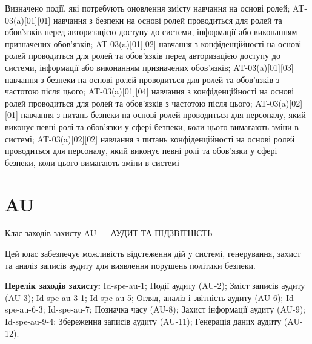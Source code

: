 \documentclass{article}
\begin{document}
{\footnotesize Визначено події, які потребують оновлення змісту навчання на основі ролей; AT-03(a)[01][01] навчання з безпеки на основі ролей проводиться для ролей та обов'язків перед авторизацією доступу до системи, інформації або виконанням призначених обов'язків; AT-03(a)[01][02] навчання з конфіденційності на основі ролей проводиться для ролей та обов'язків перед авторизацією доступу до системи, інформації або виконанням призначених обов'язків; AT-03(a)[01][03] навчання з безпеки на основі ролей проводиться для ролей та обов'язків з частотою після цього; AT-03(a)[01][04] навчання з конфіденційності на основі ролей проводиться для ролей та обов'язків з частотою після цього; AT-03(a)[02][01] навчання з питань безпеки на основі ролей проводиться для персоналу, який виконує певні ролі та обов'язки у сфері безпеки, коли цього вимагають зміни в системі; AT-03(a)[02][02] навчання з питань конфіденційності на основі ролей проводиться для персоналу, який виконує певні ролі та обов'язки у сфері безпеки, коли цього вимагають зміни в системі}




\section{AU}
Клас заходів захисту AU --- АУДИТ ТА ПІДЗВІТНІСТЬ

Цей клас забезпечує можливість відстеження дій у системі, генерування, захист та аналіз записів аудиту для виявлення порушень політики безпеки.

\textbf{Перелік заходів захисту:} Id-spe-au-1; Події аудиту (AU-2); Зміст записів аудиту (AU-3); Id-spe-au-3-1; Id-spe-au-5; Огляд, аналіз і звітність аудиту (AU-6); Id-spe-au-6-3; Id-spe-au-7; Позначка часу (AU-8); Захист інформації аудиту (AU-9); Id-spe-au-9-4; Збереження записів аудиту (AU-11); Генерація даних аудиту (AU-12).
\end{document}
